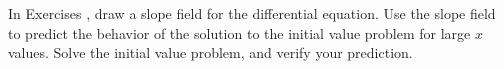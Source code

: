 {\noindent In Exercises}
{, draw a slope field for the differential equation.  Use the slope field to predict the behavior of the solution to the initial value problem for large $x$ values.  Solve the initial value problem, and verify your prediction.}
